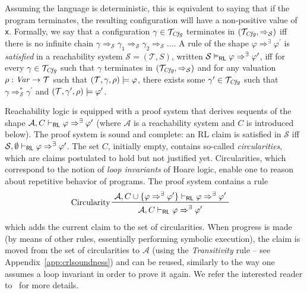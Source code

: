 Assuming the language is deterministic, this is equivalent to saying that if the program terminates,
the resulting configuration will have a non-positive value of \texttt{x}.
Formally, we say that a configuration $\gamma \in \mathcal{T}_{\mathit{Cfg}}$ terminates in $(\mathcal{T}_{\mathit{Cfg}}, \Rightarrow_{\mathcal{S}})$
iff there is no infinite chain
$\gamma \Rightarrow_{\mathcal{S}} \gamma_1 \Rightarrow_{\mathcal{S}} \gamma_2 \Rightarrow_{\mathcal{S}} \ldots$.
A rule of the shape $\varphi \Rightarrow^\exists \varphi^\prime$
is \emph{satisfied}
in a reachability system $\mathcal{S} = (\mathcal{T}, S)$,
written $\mathcal{S} \vDash_{\mathsf{RL}} \varphi \Rightarrow^\exists \varphi^\prime$,
iff for every $\gamma \in \mathcal{T}_{\mathit{Cfg}}$
such that $\gamma$ terminates in $(\mathcal{T}_{\mathit{Cfg}}, \Rightarrow_{\mathcal{S}})$
and for any valuation $\rho : \mathit{Var} \to \mathcal{T}$
such that $(\mathcal{T}, \gamma, \rho) \models \varphi$,
there exists some $\gamma^\prime \in \mathcal{T}_{\mathit{Cfg}}$
such that
$\gamma \Rightarrow^{*}_{\mathcal{S}} \gamma^\prime$
and $(\mathcal{T}, \gamma^\prime, \rho) \models \varphi^\prime$.


Reachability logic is equipped with a proof system that derives sequents of the shape
$\mathcal{A}, C \vdash_{\mathsf{RL}} \varphi \Rightarrow^\exists \varphi^\prime$ (where $\mathcal{A}$ is a
reachability system and $C$ is introduced below). The proof system is sound and complete: an RL claim is satisfied in $\mathcal{S}$
iff $\mathcal{S}, \emptyset \vdash_{\mathsf{RL}} \varphi \Rightarrow^\exists \varphi^\prime$.
The set $C$, initially empty, contains so-called \emph{circularities},
which are claims postulated to hold but not justified yet.
Circularities, which correspond to the notion of \emph{loop invariants} of Hoare logic,
enable one to reason about repetitive behavior of programs.
The proof system contains a rule
\begin{align*}
    & \prftree[l]{Circularity}
      { \mathcal{A}, C \cup \{ \varphi\Rightarrow^\exists \varphi^\prime \} \vdash_\RL \varphi \Rightarrow^\exists \varphi^\prime }
      { \mathcal{A}, C \vdash_\RL \varphi \Rightarrow^\exists \varphi^\prime }
\end{align*}
which adds the current claim to the set of circularities.  When progress is
made (by means of other rules, essentially performing symbolic execution),
the claim is moved from the set of circularities to $\mathcal{A}$ (using the
\emph{Transitivity} rule -- see Appendix~\ref{app:crlsoundness}) and can be
reused, similarly to the way one assumes a loop invariant in order to prove it
again.  We refer the interested reader to~\cite{RosuS12oopsla} for more
details.


